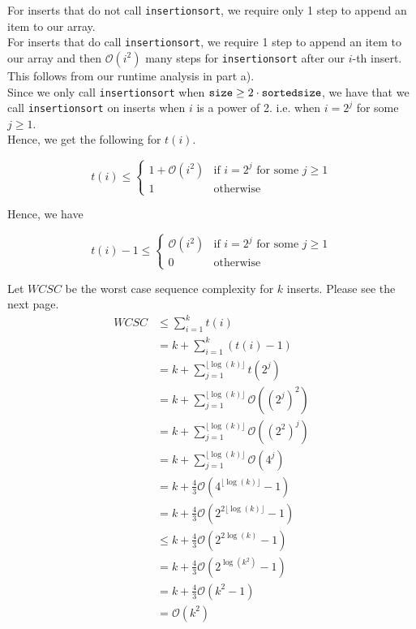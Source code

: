\documentclass[12pt]{article}
\begin{document}
For inserts that do not call \verb|insertionsort|, we require only 1 step to append an item to our array. \\

For inserts that do call \verb|insertionsort|, we require 1 step to append an item to our array and then $\mathcal{O}(i^2)$ many steps for \verb|insertionsort| after our $i$-th insert. This follows from our runtime analysis in part a). \\

Since we only call \verb|insertionsort| when $\verb|size| \geq 2 \cdot \verb|sortedsize|$, we have that we call \verb|insertionsort| on inserts when $i$ is a power of 2. i.e. when $i = 2^j$ for some $j \geq 1$. \\

Hence, we get the following for $t(i)$. 

\[
    t(i) \leq 
    \begin{cases} 
        1 + \mathcal{O}(i^2) &\text{if $i = 2^j$ for some $j \geq 1$} \\
        1 &\text{otherwise}
    \end{cases}
\]

Hence, we have

\[
    t(i) - 1 \leq 
    \begin{cases} 
        \mathcal{O}(i^2) &\text{if $i = 2^j$ for some $j \geq 1$} \\
        0 &\text{otherwise}
    \end{cases}
\]

Let $WCSC$ be the worst case sequence complexity for $k$ inserts. Please see the next page. \\

\begin{align*}
WCSC &\leq \sum_{i=1}^k t(i) \\
&= k + \sum_{i=1}^k (t(i) - 1) \\
&= k + \sum_{j=1}^{\lfloor \log(k) \rfloor} t(2^j) \\
&= k + \sum_{j=1}^{\lfloor \log(k) \rfloor} \mathcal{O}((2^j)^2) \\
&= k + \sum_{j=1}^{\lfloor \log(k) \rfloor} \mathcal{O}((2^2)^j) \\
&= k + \sum_{j=1}^{\lfloor \log(k) \rfloor} \mathcal{O}(4^j) \\
&= k + \frac{4}{3}\mathcal{O}(4^{\lfloor \log(k) \rfloor}-1) \\
&= k + \frac{4}{3}\mathcal{O}(2^{2\lfloor \log(k) \rfloor}-1) \\
&\leq k + \frac{4}{3}\mathcal{O}(2^{2\log(k)}-1) \\
&= k + \frac{4}{3}\mathcal{O}(2^{\log(k^2)}-1) \\
&= k + \frac{4}{3}\mathcal{O}(k^2-1) \\
&= \mathcal{O}(k^2)
\end{align*}
\end{document}
